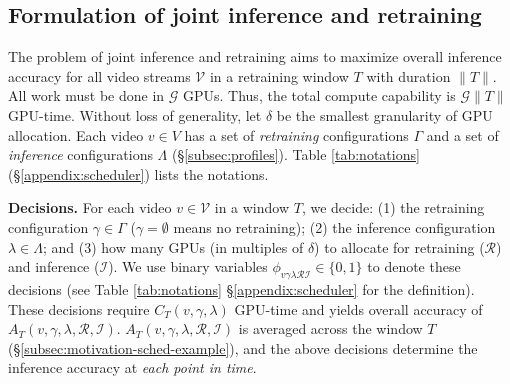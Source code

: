 




\subsection{Formulation of joint inference and retraining}
\label{subsec:formulation}

The problem of joint inference and retraining aims to maximize overall inference accuracy for all video streams $\mathcal{V}$ in a retraining window ${T}$ with duration $\lVert T \rVert$. 
All work must be done in $\mathcal{G}$ GPUs.
Thus, the total compute capability is $\mathcal{G}\lVert T \rVert$ GPU-time. Without loss of generality, let $\delta$ be the smallest granularity of GPU allocation.  %
Each video $v \in V$ has a set of \emph{retraining} configurations $\Gamma$
and a set of \emph{inference} configurations $\Lambda$ (\S\ref{subsec:profiles}).
Table \ref{tab:notations} (\S{\ref{appendix:scheduler}}) lists the notations. 



\noindent\textbf{Decisions.} For each video $v\in\mathcal{V}$ in a window $T$, we decide: (1) the retraining configuration $\gamma\in\Gamma$ ($\gamma = \emptyset$ means no retraining); (2) the inference configuration $\lambda\in\Lambda$; and (3) how many GPUs (in multiples of $\delta$) %
to allocate for retraining ($\mathcal{R}$) %
and inference ($\mathcal{I}$). %
We use binary variables $\phi_{v\gamma\lambda\mathcal{R}\mathcal{I}}\in\{0,1\}$ to denote these decisions (see Table \ref{tab:notations} \S{\ref{appendix:scheduler}} for the definition). 
These decisions require $C_T(v, \gamma, \lambda)$ GPU-time and yields overall accuracy of $A_T(v, \gamma, \lambda, \mathcal{R}, \mathcal{I})$. $A_T(v, \gamma, \lambda, \mathcal{R}, \mathcal{I})$ is averaged across the window $T$ (\S\ref{subsec:motivation-sched-example}), and the above decisions determine the inference accuracy at {\em each point in time}.


